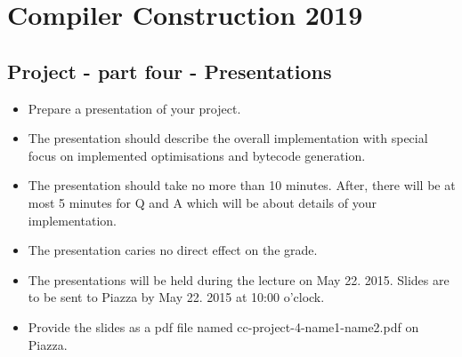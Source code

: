 

\section*{Compiler Construction 2019}


\subsection*{Project - part four - Presentations} 
\begin{itemize} 
\item Prepare a presentation of your project. \\ 

\item The presentation should describe the overall implementation with special focus on implemented optimisations and bytecode generation. \\

\item The presentation should take no more than 10 minutes. After, there will be at most 5 minutes for Q and A which will be about details of your implementation. \\

\item The presentation caries no direct effect on the grade. \\

\item The presentations will be held during the lecture on May 22. 2015. 
Slides are to be sent to Piazza by May 22. 2015 at 10:00 o'clock.\\

\item Provide the slides as a pdf file named cc-project-4-name1-name2.pdf on Piazza. 

\end{itemize}



